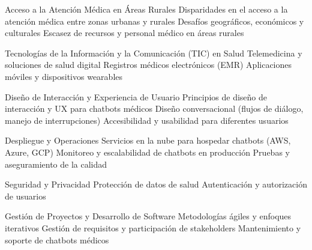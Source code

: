 Acceso a la Atención Médica en Áreas Rurales
	Disparidades en el acceso a la atención médica entre zonas urbanas y rurales
	Desafíos geográficos, económicos y culturales
	Escasez de recursos y personal médico en áreas rurales

Tecnologías de la Información y la Comunicación (TIC) en Salud
	Telemedicina y soluciones de salud digital
	Registros médicos electrónicos (EMR)
	Aplicaciones móviles y dispositivos wearables

Diseño de Interacción y Experiencia de Usuario
	Principios de diseño de interacción y UX para chatbots médicos
	Diseño conversacional (flujos de diálogo, manejo de interrupciones)
	Accesibilidad y usabilidad para diferentes usuarios

Despliegue y Operaciones
	Servicios en la nube para hospedar chatbots (AWS, Azure, GCP)
	Monitoreo y escalabilidad de chatbots en producción
	Pruebas y aseguramiento de la calidad

Seguridad y Privacidad
	Protección de datos de salud %
	Autenticación y autorización de usuarios

Gestión de Proyectos y Desarrollo de Software
	Metodologías ágiles y enfoques iterativos
	Gestión de requisitos y participación de stakeholders
	Mantenimiento y soporte de chatbots médicos